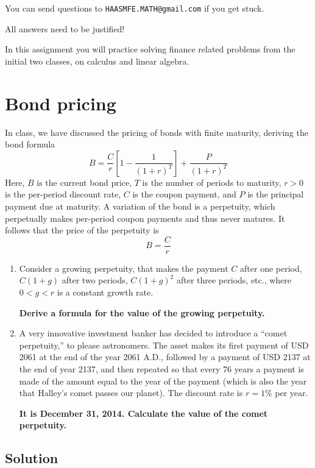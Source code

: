 \documentclass{article}
\begin{document}
\vspace{1em}

\noindent You can send questions to \texttt{HAASMFE.MATH@gmail.com} if you get stuck.

\vspace{1em}

\noindent All answers need to be justified!

\newpage
In this assignment you will practice solving finance related problems from the initial two classes, on calculus and linear algebra.
\section{Bond pricing}
In class, we have discussed the pricing of bonds with finite maturity, deriving the bond formula
\[
B=\frac{C}{r}\left[1-\frac{1}{(1+r)^{T}}\right]+\frac{P}{(1+r)^{T}}
\]
Here, $B$ is the current bond price, $T$ is the number of periods to maturity, $r>0$ is the per-period discount rate, $C$ is the coupon payment, and $P$ is the principal payment due at maturity. A variation of the bond is a perpetuity, which perpetually makes per-period coupon payments and thus never matures. It follows that the price of the perpetuity is
\[
B=\frac{C}{r}
\]

\begin{enumerate}
\item[(a)] Consider a growing perpetuity, that makes the payment $C$ after one period, $C(1+g)$ after two periods, $C(1+g)^{2}$ after three periods, etc., where $0<g<r$ is a constant growth rate.

\textbf{Derive a formula for the value of the growing perpetuity.}

\item[(b)] A very innovative investment banker has decided to introduce a ``comet perpetuity,'' to please astronomers. The asset makes its first payment of USD 2061 at the end of the year 2061 A.D., followed by a payment of USD 2137 at the end of year 2137, and then repeated so that every 76 years a payment is made of the amount equal to the year of the payment (which is also the year that Halley's comet passes our planet). The discount rate is $r=1\%$ per year.

\textbf{It is December 31, 2014. Calculate the value of the comet perpetuity.}
\end{enumerate}
\bigskip

\subsection*{Solution}
\end{document}
